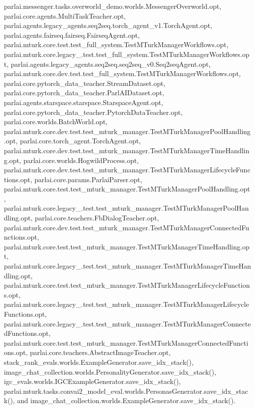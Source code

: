 parlai.\+messenger.\+tasks.\+overworld\+\_\+demo.\+worlds.\+Messenger\+Overworld.\+opt, parlai.\+core.\+agents.\+Multi\+Task\+Teacher.\+opt, parlai.\+agents.\+legacy\+\_\+agents.\+seq2seq.\+torch\+\_\+agent\+\_\+v1.\+Torch\+Agent.\+opt, parlai.\+agents.\+fairseq.\+fairseq.\+Fairseq\+Agent.\+opt, parlai.\+mturk.\+core.\+test.\+test\+\_\+full\+\_\+system.\+Test\+M\+Turk\+Manager\+Workflows.\+opt, parlai.\+mturk.\+core.\+legacy\+\_.\+test.\+test\+\_\+full\+\_\+system.\+Test\+M\+Turk\+Manager\+Workflows.\+opt, parlai.\+agents.\+legacy\+\_\+agents.\+seq2seq.\+seq2seq\+\_\+v0.\+Seq2seq\+Agent.\+opt, parlai.\+mturk.\+core.\+dev.\+test.\+test\+\_\+full\+\_\+system.\+Test\+M\+Turk\+Manager\+Workflows.\+opt, parlai.\+core.\+pytorch\+\_\+data\+\_\+teacher.\+Stream\+Dataset.\+opt, parlai.\+core.\+pytorch\+\_\+data\+\_\+teacher.\+Parl\+A\+I\+Dataset.\+opt, parlai.\+agents.\+starspace.\+starspace.\+Starspace\+Agent.\+opt, parlai.\+core.\+pytorch\+\_\+data\+\_\+teacher.\+Pytorch\+Data\+Teacher.\+opt, parlai.\+core.\+worlds.\+Batch\+World.\+opt, parlai.\+mturk.\+core.\+dev.\+test.\+test\+\_\+mturk\+\_\+manager.\+Test\+M\+Turk\+Manager\+Pool\+Handling.\+opt, parlai.\+core.\+torch\+\_\+agent.\+Torch\+Agent.\+opt, parlai.\+mturk.\+core.\+dev.\+test.\+test\+\_\+mturk\+\_\+manager.\+Test\+M\+Turk\+Manager\+Time\+Handling.\+opt, parlai.\+core.\+worlds.\+Hogwild\+Process.\+opt, parlai.\+mturk.\+core.\+dev.\+test.\+test\+\_\+mturk\+\_\+manager.\+Test\+M\+Turk\+Manager\+Lifecycle\+Functions.\+opt, parlai.\+core.\+params.\+Parlai\+Parser.\+opt, parlai.\+mturk.\+core.\+test.\+test\+\_\+mturk\+\_\+manager.\+Test\+M\+Turk\+Manager\+Pool\+Handling.\+opt, parlai.\+mturk.\+core.\+legacy\+\_.\+test.\+test\+\_\+mturk\+\_\+manager.\+Test\+M\+Turk\+Manager\+Pool\+Handling.\+opt, parlai.\+core.\+teachers.\+Fb\+Dialog\+Teacher.\+opt, parlai.\+mturk.\+core.\+dev.\+test.\+test\+\_\+mturk\+\_\+manager.\+Test\+M\+Turk\+Manager\+Connected\+Functions.\+opt, parlai.\+mturk.\+core.\+test.\+test\+\_\+mturk\+\_\+manager.\+Test\+M\+Turk\+Manager\+Time\+Handling.\+opt, parlai.\+mturk.\+core.\+legacy\+\_.\+test.\+test\+\_\+mturk\+\_\+manager.\+Test\+M\+Turk\+Manager\+Time\+Handling.\+opt, parlai.\+mturk.\+core.\+test.\+test\+\_\+mturk\+\_\+manager.\+Test\+M\+Turk\+Manager\+Lifecycle\+Functions.\+opt, parlai.\+mturk.\+core.\+legacy\+\_.\+test.\+test\+\_\+mturk\+\_\+manager.\+Test\+M\+Turk\+Manager\+Lifecycle\+Functions.\+opt, parlai.\+mturk.\+core.\+legacy\+\_.\+test.\+test\+\_\+mturk\+\_\+manager.\+Test\+M\+Turk\+Manager\+Connected\+Functions.\+opt, parlai.\+mturk.\+core.\+test.\+test\+\_\+mturk\+\_\+manager.\+Test\+M\+Turk\+Manager\+Connected\+Functions.\+opt, parlai.\+core.\+teachers.\+Abstract\+Image\+Teacher.\+opt, stack\+\_\+rank\+\_\+evals.\+worlds.\+Example\+Generator.\+save\+\_\+idx\+\_\+stack(), image\+\_\+chat\+\_\+collection.\+worlds.\+Personality\+Generator.\+save\+\_\+idx\+\_\+stack(), igc\+\_\+evals.\+worlds.\+I\+G\+C\+Example\+Generator.\+save\+\_\+idx\+\_\+stack(), parlai.\+mturk.\+tasks.\+convai2\+\_\+model\+\_\+eval.\+worlds.\+Personas\+Generator.\+save\+\_\+idx\+\_\+stack(), and image\+\_\+chat\+\_\+collection.\+worlds.\+Example\+Generator.\+save\+\_\+idx\+\_\+stack().

